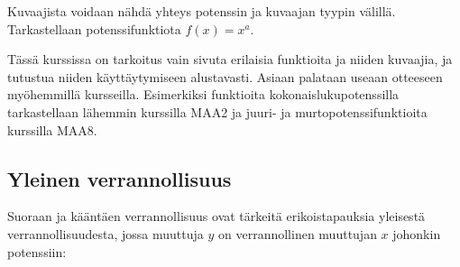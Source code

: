 Kuvaajista voidaan nähdä yhteys potenssin ja kuvaajan tyypin välillä. Tarkastellaan potenssifunktiota $f(x)=x^a$.


%	

Tässä kurssissa on tarkoitus vain sivuta erilaisia funktioita ja niiden kuvaajia, ja tutustua niiden käyttäytymiseen alustavasti. Asiaan palataan useaan otteeseen myöhemmillä kursseilla. Esimerkiksi funktioita kokonaislukupotenssilla tarkastellaan lähemmin kurssilla MAA2 ja juuri- ja murtopotenssifunktioita kurssilla MAA8.

\subsection{Yleinen verrannollisuus}

Suoraan ja kääntäen verrannollisuus ovat tärkeitä erikoistapauksia yleisestä verrannollisuudesta, jossa muuttuja $y$ on verrannollinen muuttujan $x$ johonkin potenssiin:

